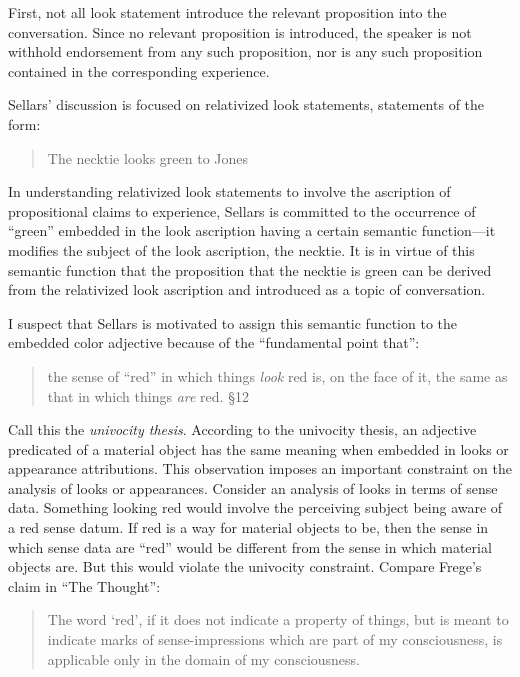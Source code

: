 \documentclass[12pt]{article}
\begin{document}
First, not all look statement introduce the relevant proposition into the conversation. Since no relevant proposition is introduced, the speaker is not withhold endorsement from any such proposition, nor is any such proposition contained in the corresponding experience. 

Sellars' discussion is focused on relativized look statements, statements of the form:
\begin{quote}
    The necktie looks green to Jones
\end{quote}
In understanding relativized look statements to involve the ascription of propositional claims to experience, Sellars is committed to the occurrence of ``green'' embedded in the look ascription having a certain semantic function---it modifies the subject of the look ascription, the necktie. It is in virtue of this semantic function that the proposition that the necktie is green can be derived from the relativized look ascription and introduced as a topic of conversation. 

I suspect that Sellars is motivated to assign this semantic function to the embedded color adjective because of the ``fundamental point that'':
\begin{quote}
    the sense of ``red'' in which things \emph{look} red is, on the face of it, the same as that in which things \emph{are} red. §12
\end{quote} 
Call this the \emph{univocity thesis}. According to the univocity thesis, an adjective predicated of a material object has the same meaning when embedded in looks or appearance attributions. This observation imposes an important constraint on the analysis of looks or appearances. Consider an analysis of looks in terms of sense data. Something looking red would involve the perceiving subject being aware of a red sense datum. If red is a way for material objects to be, then the sense in which sense data are ``red'' would be different from the sense in which material objects are. But this would violate the univocity constraint. Compare Frege's claim in ``The Thought'': 
\begin{quote}
	The word `red', if it does not indicate a property of things, but is meant to indicate marks of sense-impressions which are part of my consciousness, is applicable only in the domain of my consciousness. \citet[67]{Frege:1918lq}
\end{quote}
\end{document}
